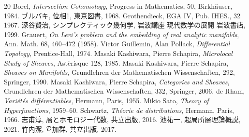 \begin{thebibliography}{20} 
     Borel, 
        \textit{Intersection Cohomology}, 
        Progress in Mathematics, 50, Birkh\"auser, 1984.
     ブルバキ, 位相1, 東京図書, 1968.
     Grothendieck, EGA IV, Pub. IHES., 32 1967.
     深谷賢治, シンプレクティック幾何学, 岩波講座 現代数学の展開 岩波書店, 1999.
     Grauert, 
        \textit{On Levi's problem and the embedding of real analytic manifolds}, 
        Ann. Math. 68, 460--472 (1958).
     Victor Guillemin, Alan Pollack, 
        \textit{Differential Topology}, 
        Prentice-Hall, 1974.
     Masaki Kashiwara, Pierre Schapira, 
        \textit{Microlocal Study of Sheaves}, 
        Ast\`erisque 128, 1985.
     Masaki Kashiwara, Pierre Schapira, 
        \textit{Sheaves on Manifolds}, 
        Grundlehren der Mathematischen Wissenschaften, 292, Springer, 1990.
     Masaki Kashiwara, Pierre Schapira, 
        \textit{Categories and Sheaves}, 
        Grundlehren der Mathematischen Wissenschaften, 332, Springer, 2006.
     de Rham, 
        \textit{Vari\'et\'es diff\'erentiables}, 
        Hermann, Paris, 1955.
     Mikio Sato, 
        \textit{Theory of Hyperfunctions}, 
        1959--60.
     Schwartz, 
        \textit{Th\'eorie de distributions}, 
        Hermann, Paris, 1966.
     志甫淳, 層とホモロジー代数, 共立出版, 2016.
     池祐一, 超局所層理論概説, 2021.
     竹内潔, \(\mathcal{D}\)加群, 共立出版, 2017.
\end{thebibliography}




